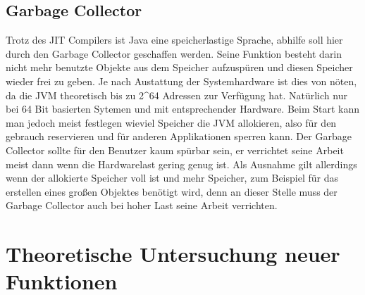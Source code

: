 \section{Garbage Collector}
\label{sec:GC}
Trotz des JIT Compilers ist Java eine speicherlastige Sprache, abhilfe soll hier
durch den Garbage Collector geschaffen werden. Seine Funktion besteht darin
nicht mehr benutzte Objekte aus dem Speicher aufzuspüren und diesen Speicher
wieder frei zu geben. Je nach Austattung der Systemhardware ist dies von nöten,
da die JVM theoretisch bis zu 2\textasciicircum64 Adressen zur Verfügung hat.
Natürlich nur bei 64 Bit basierten Sytemen und mit entsprechender Hardware. Beim Start kann man
jedoch meist festlegen wieviel Speicher die JVM allokieren, also für den
gebrauch reservieren und für anderen Applikationen sperren kann. Der Garbage
Collector sollte für den Benutzer kaum spürbar sein, er verrichtet seine Arbeit
meist dann wenn die Hardwarelast gering genug ist. Als Ausnahme gilt allerdings
wenn der allokierte Speicher voll ist und mehr Speicher, zum Beispiel für das
erstellen eines großen Objektes benötigt wird, denn an dieser Stelle muss der
Garbage Collector auch bei hoher Last seine Arbeit verrichten.

\chapter{Theoretische Untersuchung neuer Funktionen}
\label{sec:Theorie}

